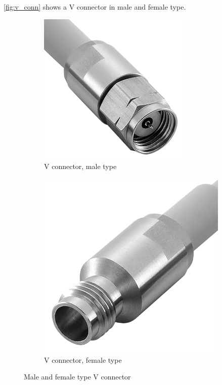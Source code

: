 \autoref{fig:v_conn} shows a V connector in male and female type.
\begin{figure}[tbh]
	\centering
	\begin{subfigure}{0.4\textwidth}
		\centering
		\includegraphics[width=0.8\textwidth]{chap/04-theresa/img/connectors/v_m}  
		\caption{V connector, male type}
		\label{fig:v_m}
	\end{subfigure}
	\hfill
	\begin{subfigure}{0.4\textwidth}
		\centering
		\includegraphics[height=0.8\textwidth]{chap/04-theresa/img/connectors/v_f}  
		\caption{V connector, female type}
		\label{fig:v_f}
	\end{subfigure}
	\caption{Male and female type V connector}
	\label{fig:v_conn}
\end{figure}

